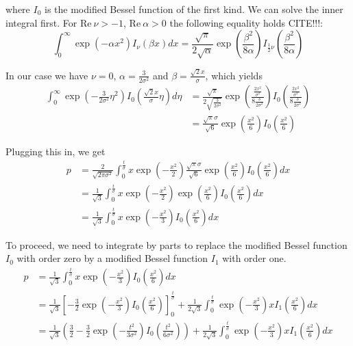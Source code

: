 \documentclass[a4paper,12pt]{article}
\theoremstyle{plain}
\theoremstyle{definition}
\theoremstyle{remark}
\begin{document}
where $I_0$ is the modified Bessel function of the first kind. We can solve the inner integral first. For $\mathrm{Re} \ \nu > -1$, $\mathrm{Re} \ \alpha > 0$ the following equality holds CITE!!!:
\begin{equation*}
	\int_0^\infty \exp \left( - \alpha x^2 \right) I_\nu ( \beta x ) dx = \frac{\sqrt{\pi}}{2 \sqrt{\alpha}} \exp \left( \frac{\beta^2}{8 \alpha} \right) I_{\frac{1}{2} \nu} \left( \frac{\beta^2}{8 \alpha} \right)
\end{equation*}

In our case we have $\nu = 0$, $\alpha = \frac{3}{2 \sigma^2}$ and $\beta = \frac{\sqrt{2} x}{\sigma}$, which yields
\begin{align*}
	\int_0^\infty \exp \left( - \frac{3}{2 \sigma^2} \eta^2 \right) I_0 \left( \frac{\sqrt{2} x}{\sigma} \eta \right) d\eta &= \frac{\sqrt{\pi}}{2 \sqrt{\frac{3}{2 \sigma^2}}} \exp \left( \frac{\frac{2 x^2}{\sigma^2}}{8 \frac{3}{2 \sigma^2}} \right) I_0 \left( \frac{\frac{2 x^2}{\sigma^2}}{8 \frac{3}{2 \sigma^2}} \right) \\
	&= \frac{\sqrt{\pi} \sigma}{\sqrt{6}} \exp \left( \frac{x^2}{6} \right) I_0 \left( \frac{x^2}{6} \right)
\end{align*}

Plugging this in, we get
\begin{align*}
	p &= \frac{2}{\sqrt{2 \pi \sigma^2}} \int_0^\frac{t}{\sigma} x \exp \left( - \frac{x^2}{2} \right) \frac{\sqrt{\pi} \sigma}{\sqrt{6}} \exp \left( \frac{x^2}{6} \right) I_0 \left( \frac{x^2}{6} \right) dx \\
	&= \frac{1}{\sqrt{3}} \int_0^\frac{t}{\sigma} x \exp \left( - \frac{x^2}{2} \right) \exp \left( \frac{x^2}{6} \right) I_0 \left( \frac{x^2}{6} \right) dx \\
	&= \frac{1}{\sqrt{3}} \int_0^\frac{t}{\sigma} x \exp \left( - \frac{x^2}{3} \right) I_0 \left( \frac{x^2}{6} \right) dx
\end{align*}

To proceed, we need to integrate by parts to replace the modified Bessel function $I_0$ with order zero by a modified Bessel function $I_1$ with order one.
\begin{align*}
	p &= \frac{1}{\sqrt{3}} \int_0^\frac{t}{\sigma} x \exp \left( - \frac{x^2}{3} \right) I_0 \left( \frac{x^2}{6} \right) dx \\
	&= \frac{1}{\sqrt{3}} \left[ - \frac{3}{2} \exp \left( - \frac{x^2}{3} \right) I_0 \left( \frac{x^2}{6} \right) \right]_0^\frac{t}{\sigma} + \frac{1}{2 \sqrt{3}} \int_0^\frac{t}{\sigma} \exp \left( - \frac{x^2}{3} \right) x I_1 \left( \frac{x^2}{6} \right) dx \\
	&= \frac{1}{\sqrt{3}} \left( \frac{3}{2} - \frac{3}{2} \exp \left( - \frac{t^2}{3 \sigma^2} \right) I_0 \left( \frac{t^2}{6 \sigma^2} \right) \right) + \frac{1}{2 \sqrt{3}} \int_0^\frac{t}{\sigma} \exp \left( - \frac{x^2}{3} \right) x I_1 \left( \frac{x^2}{6} \right) dx
\end{align*}
\end{document}
